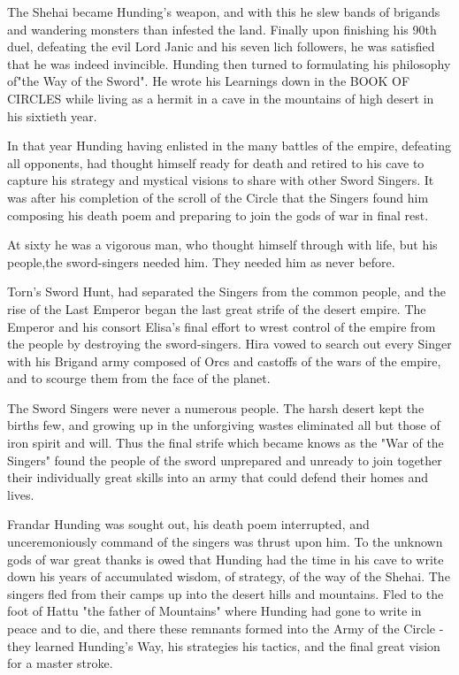 The Shehai became Hunding's weapon, and with this he slew bands of brigands and wandering monsters than infested the land. Finally upon finishing his 90th duel, defeating the evil Lord Janic and his seven lich followers, he was satisfied that he was indeed invincible. Hunding then turned to formulating his philosophy of"the Way of the Sword". He wrote his Learnings down in the BOOK OF CIRCLES while living as a hermit in a cave in the mountains of high desert in his sixtieth year.

In that year Hunding having enlisted in the many battles of the empire, defeating all opponents, had thought himself ready for death and retired to his cave to capture his strategy and mystical visions to share with other Sword Singers. It was after his completion of the scroll of the Circle that the Singers found him composing his death poem and preparing to join the gods of war in final rest.

At sixty he was a vigorous man, who thought himself through with life, but his people,the sword-singers needed him. They needed him as never before.

Torn's Sword Hunt, had separated the Singers from the common people, and the rise of the Last Emperor began the last great strife of the desert empire. The Emperor and his consort Elisa's final effort to wrest control of the empire from the people by destroying the sword-singers. Hira vowed to search out every Singer with his Brigand army composed of Orcs and castoffs of the wars of the empire, and to scourge them from the face of the planet.

The Sword Singers were never a numerous people. The harsh desert kept the births few, and growing up in the unforgiving wastes eliminated all but those of iron spirit and will. Thus the final strife which became knows as the "War of the Singers" found the people of the sword unprepared and unready to join together their individually great skills into an army that could defend their homes and lives.

Frandar Hunding was sought out, his death poem interrupted, and unceremoniously command of the singers was thrust upon him. To the unknown gods of war great thanks is owed that Hunding had the time in his cave to write down his years of accumulated wisdom, of strategy, of the way of the Shehai. The singers fled from their camps up into the desert hills and mountains. Fled to the foot of Hattu "the father of Mountains" where Hunding had gone to write in peace and to die, and there these remnants formed into the Army of the Circle - they learned Hunding's Way, his strategies his tactics, and the final great vision for a master stroke.

